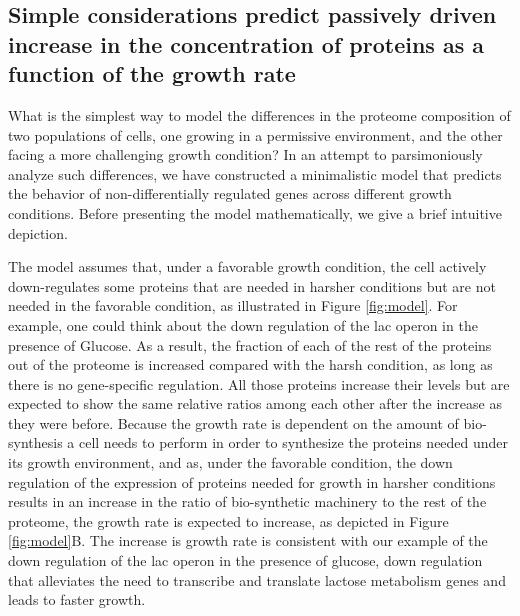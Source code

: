 \subsection{Simple considerations predict passively driven increase in the concentration of proteins as a function of the growth rate}
What is the simplest way to model the differences in the proteome composition of two populations of cells, one growing in a permissive environment, and the other facing a more challenging growth condition?
In an attempt to parsimoniously analyze such differences, we have constructed a minimalistic model that predicts the behavior of non-differentially regulated genes across different growth conditions.
Before presenting the model mathematically, we give a brief intuitive depiction.

The model assumes that, under a favorable growth condition, the cell actively down-regulates some proteins that are needed in harsher conditions but are not needed in the favorable condition, as illustrated in Figure \ref{fig:model}.
For example, one could think about the down regulation of the lac operon in the presence of Glucose. 
As a result, the fraction of each of the rest of the proteins out of the proteome is increased compared with the harsh condition, as long as there is no gene-specific regulation.
All those proteins increase their levels but are expected to show the same relative ratios among each other after the increase as they were before. 
Because the growth rate is dependent on the amount of bio-synthesis a cell needs to perform in order to synthesize the proteins needed under its growth environment, and as, under the favorable condition, the down regulation of the expression of proteins needed for growth in harsher conditions results in an increase in the ratio of bio-synthetic machinery to the rest of the proteome, the growth rate is expected to increase, as  depicted in Figure \ref{fig:model}B.
The increase is growth rate is consistent with our example of the down regulation of the lac operon in the presence of glucose, down regulation that alleviates the need to transcribe and translate lactose metabolism genes and leads to faster growth.